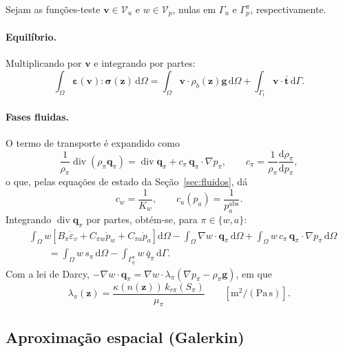 \documentclass[11pt,a4paper]{article}
\newcommand{\Div}{\operatorname{div}}
\newcommand{\dd}{\mathrm{d}}
\begin{document}
Sejam as funções-teste $\mathbf v\in\mathcal V_u$ e $w\in\mathcal V_p$,
nulas em $\Gamma_u$ e $\Gamma_p^{\pi}$, respectivamente.

\paragraph{Equilíbrio.} Multiplicando por $\mathbf v$ e integrando por partes:
\begin{equation*}
\boxed{\int_\Omega\boldsymbol\varepsilon(\mathbf v):\boldsymbol\sigma(\mathbf z)\,\dd\Omega
=\int_\Omega\mathbf v\cdot\rho_b(\mathbf z)\mathbf g\,\dd\Omega
+\int_{\Gamma_t}\mathbf v\cdot\bar{\mathbf t}\,\dd\Gamma.}
\end{equation*}

\paragraph{Fases fluidas.} O termo de transporte é expandido como
\begin{equation*}
\frac{1}{\rho_\pi}\Div(\rho_\pi\mathbf q_\pi)
=\Div\mathbf q_\pi+c_\pi\,\mathbf q_\pi\cdot\nabla p_\pi,
\qquad
c_\pi=\frac{1}{\rho_\pi}\frac{\dd\rho_\pi}{\dd p_\pi},
\end{equation*}
o que, pelas equações de estado da Seção~\ref{sec:fluidos}, dá
\begin{equation*}
c_w=\frac{1}{K_w},\qquad c_a(p_a)=\frac{1}{p_a^{\mathrm{abs}}}.
\end{equation*}
Integrando $\Div\mathbf q_\pi$ por partes, obtém-se, para $\pi\in\{w,a\}$:
\begin{equation*}
\boxed{\begin{aligned}
&\int_\Omega w\left[B_\pi\dot\varepsilon_v+C_{\pi w}\dot p_w+C_{\pi a}\dot p_a\right]\dd\Omega
-\int_\Omega\nabla w\cdot\mathbf q_\pi\,\dd\Omega
+\int_\Omega w\,c_\pi\,\mathbf q_\pi\cdot\nabla p_\pi\,\dd\Omega\\
&\qquad=\int_\Omega w\,s_\pi\,\dd\Omega-\int_{\Gamma_q^{\pi}}w\,\bar q_\pi\,\dd\Gamma .
\end{aligned}}
\end{equation*}
Com a lei de Darcy, $-\nabla w\cdot\mathbf q_\pi
=\nabla w\cdot\lambda_\pi(\nabla p_\pi-\rho_\pi\mathbf g)$, em que
\begin{equation*}
\boxed{\lambda_\pi(\mathbf z)=\frac{\kappa(n(\mathbf z))\,k_{r\pi}(S_\pi)}{\mu_\pi}
\qquad[\mathrm{m^2/(Pa\,s)}].}
\end{equation*}

\subsection{Aproximação espacial (Galerkin)}
\end{document}
